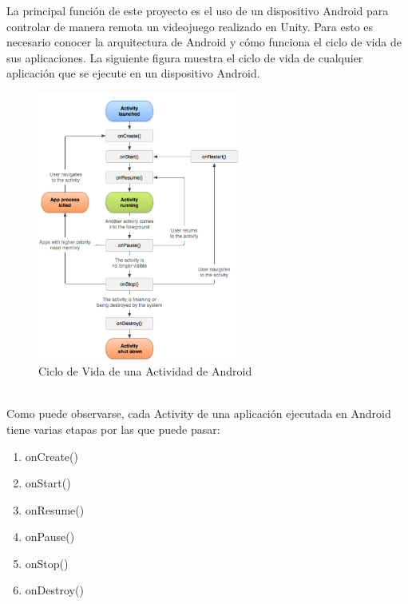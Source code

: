 La principal funci\'on de este proyecto es el uso de un dispositivo Android para controlar de manera remota un videojuego realizado en Unity. Para esto es necesario conocer la arquitectura de Android y c\'omo funciona el ciclo de vida de sus aplicaciones.
La siguiente figura muestra el ciclo de vida de cualquier aplicaci\'on que se ejecute en un dispositivo Android.
\\
\begin{figure}[h]

\centering
\includegraphics[width=0.6\textwidth]{Imagenes/Bitmap/Ciclo_de_vida_Android.png}
\caption{Ciclo de Vida de una Actividad de Android}
 \label{Ciclo de vida android}
\end{figure}
\\
Como puede observarse, cada Activity de una aplicaci\'on ejecutada en Android tiene varias etapas por las que puede pasar:

\begin{enumerate}
\item onCreate()
\item onStart()
\item onResume()
\item onPause()
\item onStop()
\item onDestroy()
\end {enumerate}

